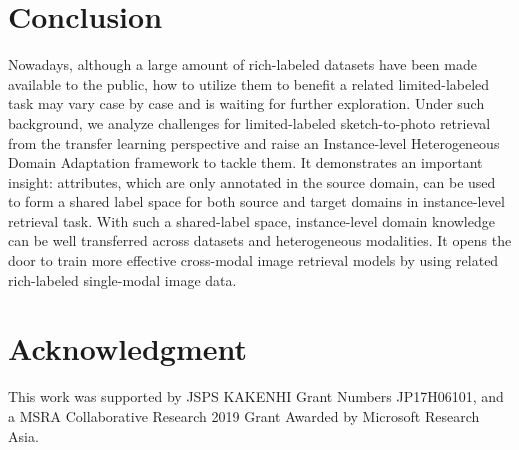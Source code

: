 \documentclass[journal]{IEEEtran}
\begin{document}
\section{Conclusion}
\label{sec:conclusion}

Nowadays, although a large amount of rich-labeled datasets have been made available to the public, how to utilize them to benefit a related limited-labeled task may vary case by case and is waiting for further exploration. Under such background, we analyze challenges for limited-labeled sketch-to-photo retrieval from the transfer learning perspective and raise an Instance-level Heterogeneous Domain Adaptation framework to tackle them. It demonstrates an important insight: attributes, which are only annotated in the source domain, can be used to form a shared label space for both source and target domains in instance-level retrieval task. With such a shared-label space, instance-level domain knowledge can be well transferred across datasets and heterogeneous modalities. It opens the door to train more effective cross-modal image retrieval models by using related rich-labeled single-modal image data.


\section*{Acknowledgment}
This work was supported by JSPS KAKENHI Grant Numbers JP17H06101, and a MSRA Collaborative Research 2019 Grant Awarded by Microsoft Research Asia.




\ifCLASSOPTIONcaptionsoff
  \newpage
\fi




\end{document}
